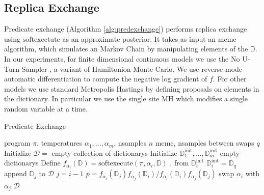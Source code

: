 \subsection{Replica Exchange}

Predicate exchange (Algorithm \ref{alg:predexchange}) performs replica exchange using $\textrm{softexectute}$ as an approximate posterior.
It takes as input an mcmc algorithm, which simulates an Markov Chain by manipulating elements of the $\mathbb{D}$.
In our experiments, for finite dimensional continuous models we use the No U-Turn Sampler \cite{hoffman2014no}, a variant of Hamiltonion Monte Carlo.
We use reverse-mode automatic differentiation \cite{griewank2008evaluating} to compute the negative log gradient of $f$.
For other models we use standard Metropolis Hastings by defining proposals on elements in the dictionary.
In particular we use the single site MH \cite{wingate2011lightweight} which modifies a single random variable at a time.




\begin{algorithm}[tb]
  \caption{Predicate Exchange}
  \label{alg:predexchange}
\begin{algorithmic}
 program $\pi$, temperatures $\alpha_1, ...,\alpha_m$, nsamples $n$
 mcmc, nsamples between swaps $q$ 
\STATE Initialize $\mathcal{D} = $ empty collection of dictionarys
\STATE Initialize $\mathbb{D}^{\textrm{init}}_1,...,\mathbb{D}^{\textrm{init}}_m$ empty dictionarys
\STATE Define $f_{\alpha_i}(\mathbb{D}) = \textrm{softexecute}(\pi, \alpha_i, \mathbb{D})$
\REPEAT
    , from $\mathbb{D}^{\textrm{init}}_i$
    \STATE $\mathbb{D}^{\textrm{init}}_i = \mathbb{D}_q$
        \STATE append $\mathbb{D}_j$ to $\mathcal{D}$
      \ENDIF
    \ENDFOR
  \ENDFOR
    \STATE $j = i - 1$
    \STATE $p = {f_{\alpha_i}(\mathbb{D}_j)f_{\alpha_j}(\mathbb{D}_i)}/{f_{\alpha_i}(\mathbb{D}_i)f_{\alpha_j}(\mathbb{D}_j)}$
      \STATE swap $\alpha_i$ with $\alpha_j$
    \ENDIF
  \ENDFOR
{}
 $\mathcal{D}$
\end{algorithmic}
\end{algorithm}
